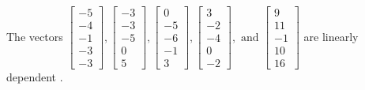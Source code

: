 \begin{exercise}
\begin{exerciseStatement}
  \end{exerciseStatement}
  \begin{exerciseAnswer}
   The vectors \(\left[\begin{array}{r}
-5 \\
-4 \\
-1 \\
-3 \\
-3
\end{array}\right] , \left[\begin{array}{r}
-3 \\
-3 \\
-5 \\
0 \\
5
\end{array}\right] , \left[\begin{array}{r}
0 \\
-5 \\
-6 \\
-1 \\
3
\end{array}\right] , \left[\begin{array}{r}
3 \\
-2 \\
-4 \\
0 \\
-2
\end{array}\right] , \text{ and } \left[\begin{array}{r}
9 \\
11 \\
-1 \\
10 \\
16
\end{array}\right]\) are 
  	 linearly dependent  .
  


  \end{exerciseAnswer}
\end{exercise}